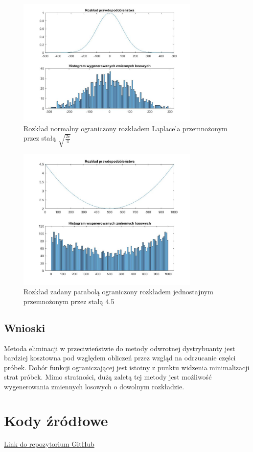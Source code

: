 \documentclass[a4paper,onecolumn,oneside,12pt,extrafontsizes]{article}
\begin{document}
\begin{figure}[!htb]
	\centering
	\caption{Rozkład normalny ograniczony rozkładem Laplace'a przemnożonym przez stałą $\sqrt{\frac{2e}{\pi}}$ }
	\includegraphics[width=9cm]{fig5.jpg}
\end{figure}

\begin{figure}[!htb]
	\centering
	\caption{Rozkład zadany parabolą ograniczony rozkładem jednostajnym przemnożonym przez stałą 4.5}
	\includegraphics[width=9cm]{fig6.jpg}
\end{figure}
\newpage
\newpage
\subsection{Wnioski}
Metoda eliminacji w przeciwieństwie do metody odwrotnej dystrybuanty jest bardziej kosztowna pod względem obliczeń przez wzgląd na odrzucanie części próbek. Dobór funkcji ograniczającej jest istotny z punktu widzenia minimalizacji strat próbek. Mimo stratności, dużą zaletą tej metody jest możliwość wygenerowania zmiennych losowych o dowolnym rozkładzie.

\section{Kody źródłowe}
\href{https://github.com/waniadze314/Modelowanie_i_Identyfikacja}{Link do repozytorium GitHub}
\end{document}
